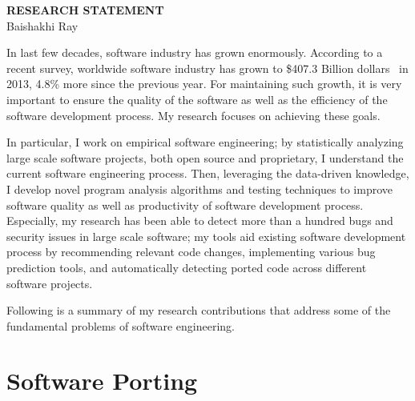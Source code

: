 \documentclass[a4paper, 11pt]{article}
\begin{document}
\thispagestyle{fancy}
\lhead{}
\rhead{}


\pagestyle{fancy}
\rhead{\grayline{\thepage/\totalpages{}}}

\begin{small}

\begin{center}
{\large \bf RESEARCH STATEMENT}\\
\vspace*{0.4cm}
{\normalsize Baishakhi Ray}%
\end{center}

In last few decades, software industry has grown enormously. According to a recent survey,
worldwide software industry has grown to \$407.3 Billion dollars~\cite{Gartner13} in 2013,
4.8\% more since the previous year. For maintaining such growth, it is very important to ensure
the quality of the software as well as the efficiency of the software development process. My
research focuses on achieving these goals.  

In particular, I work on {empirical software engineering}; by statistically analyzing large
scale software projects, both open source and proprietary, I understand the current software
engineering process. Then, leveraging the data-driven knowledge, I develop novel program
analysis algorithms and testing techniques to improve software quality as well as productivity
of software development process. Especially, my research has been able to detect more than a
hundred bugs and security issues in large scale software; my tools aid existing software
development process by recommending relevant code changes, implementing various bug prediction
tools, and automatically detecting ported code across different software projects.  


Following is a summary of my research contributions that address some of the fundamental
problems of software engineering.

\section*{\large Software Porting}


\end{small}
\end{document}
